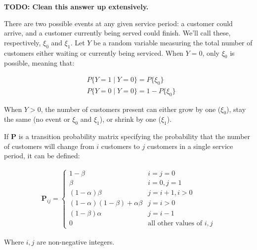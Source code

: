\begin{solution}

    \textbf{TODO: Clean this answer up extensively.}

    There are two possible events at any given service period: a
    customer could arrive, and a customer currently being served could
    finish. We'll call these, respectively, $\xi_0$ and $\xi_1$. Let $Y$
    be a random variable measuring the total number of customers either
    waiting or currently being serviced. When $Y=0$, only $\xi_0$ is
    possible, meaning that:

    \begin{align*}
    &P\lbrace Y = 1 \mid Y = 0\rbrace = P\lbrace\xi_0\rbrace \\
    &P\lbrace Y = 0 \mid Y = 0\rbrace = 1 - P\lbrace\xi_0\rbrace
    \end{align*}

    When $Y > 0$, the number of customers present can either grow by one
    ($\xi_0$), stay the same (no event or $\xi_0$ and $\xi_1$), or
    shrink by one ($\xi_1$).

    If \textbf{P} is a transition probability matrix specifying the
    probability that the number of customers will change from $i$
    customers to $j$ customers in a single service period, it can be
    defined:

    \begin{align*}
        \textbf{P}_{ij} = 
        \begin{cases}
            1 - \beta & i = j = 0 \\
            \beta & i = 0, j = 1 \\
            (1 - \alpha)\beta & j = i+1, i > 0\\
            (1 - \alpha)(1-\beta) + \alpha\beta & j=i>0\\
            (1 - \beta)\alpha & j = i - 1\\
            0 & \text{all other values of }i, j
        \end{cases}
    \end{align*}

    Where $i,j$ are non-negative integers.

\end{solution}
